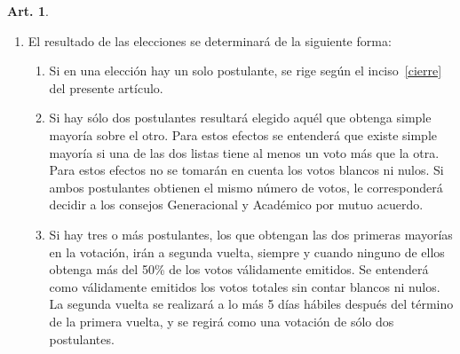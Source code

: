 \documentclass[letterpaper,11pt]{article}
\theoremstyle{definition}%
\newtheorem{art}{Art.} %
\begin{document}
\begin{art}
\begin{enumerate}
		\item El resultado de las elecciones se determinará de la siguiente forma:
		      \begin{enumerate}
			      \item Si en una elección hay un solo postulante, se rige según el inciso~\ref{cierre} del presente artículo.
			      \item Si hay sólo dos postulantes resultará elegido aquél que obtenga simple mayoría sobre el otro. Para estos efectos se entenderá que existe simple mayoría si una de las dos listas tiene al menos un voto más que la otra. Para estos efectos no se tomarán en cuenta los votos blancos ni nulos. Si ambos postulantes obtienen el mismo número de votos, le corresponderá decidir a los consejos Generacional y Académico por mutuo acuerdo.
			      \item Si hay tres o más postulantes, los que obtengan las dos primeras mayorías en la votación, irán a segunda vuelta, siempre y cuando ninguno de ellos obtenga más del 50\% de los votos válidamente emitidos. Se entenderá como válidamente emitidos los votos totales sin contar blancos ni nulos. La segunda vuelta se realizará a lo más 5 días hábiles después del término de la primera vuelta, y se regirá como una votación de sólo dos postulantes.
		      \end{enumerate}
	\end{enumerate}
\end{art}
\end{document}
